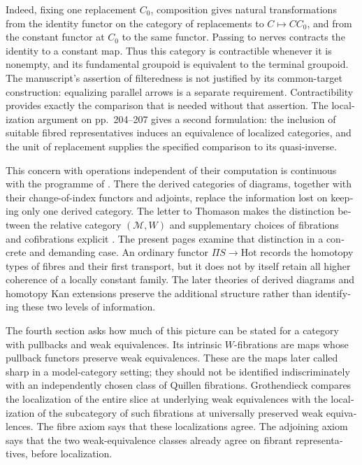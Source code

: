 \begin{otherlanguage}{english}
Indeed, fixing one replacement $C_0$, composition gives natural transformations from the identity functor on the category of replacements to $C\mapsto C C_0$, and from the constant functor at $C_0$ to the same functor. Passing to nerves contracts the identity to a constant map. Thus this category is contractible whenever it is nonempty, and its fundamental groupoid is equivalent to the terminal groupoid. The manuscript's assertion of filteredness is not justified by its common-target construction: equalizing parallel arrows is a separate requirement. Contractibility provides exactly the comparison that is needed without that assertion. The localization argument on pp.~204--207 gives a second formulation: the inclusion of suitable fibred representatives induces an equivalence of localized categories, and the unit of replacement supplies the specified comparison to its quasi-inverse.

This concern with operations independent of their computation is continuous with the programme of \citet[\S69, printed pp.~1--3]{Grothendieck1983}. There the derived categories of diagrams, together with their change-of-index functors and adjoints, replace the information lost on keeping only one derived category. The letter to Thomason makes the distinction between the relative category $(\mathcal M,W)$ and supplementary choices of fibrations and cofibrations explicit \citep[points~1--2]{Grothendieck1991Letter}. The present pages examine that distinction in a concrete and demanding case. An ordinary functor $\Pi S\to\mathrm{Hot}$ records the homotopy types of fibres and their first transport, but it does not by itself retain all higher coherence of a locally constant family. The later theories of derived diagrams and homotopy Kan extensions preserve the additional structure rather than identifying these two levels of information.

The fourth section asks how much of this picture can be stated for a category with pullbacks and weak equivalences. Its intrinsic $W$-fibrations are maps whose pullback functors preserve weak equivalences. These are the maps later called sharp in a model-category setting; they should not be identified indiscriminately with an independently chosen class of Quillen fibrations. Grothendieck compares the localization of the entire slice at underlying weak equivalences with the localization of the subcategory of such fibrations at universally preserved weak equivalences. The fibre axiom says that these localizations agree. The adjoining axiom says that the two weak-equivalence classes already agree on fibrant representatives, before localization.


\end{otherlanguage}
